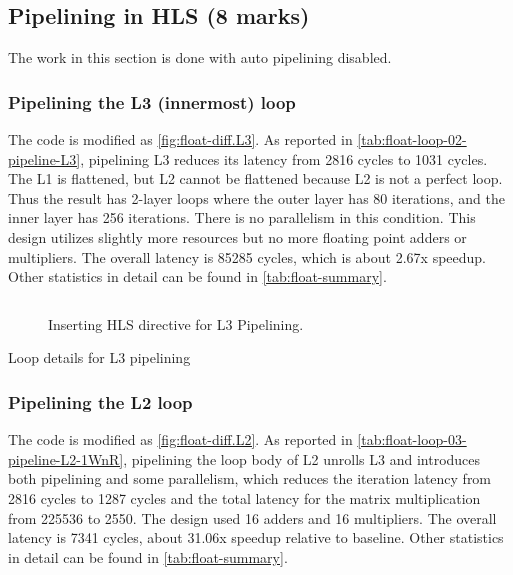 \subsection{Pipelining in HLS (8 marks)}

The work in this section is done with auto pipelining disabled.

\subsubsection{Pipelining the L3 (innermost) loop}\label{sec:1bL3}

The code is modified as \autoref{fig:float-diff.L3}.
As reported in \autoref{tab:float-loop-02-pipeline-L3}, pipelining L3 reduces its latency from 2816 cycles to 1031 cycles.
The L1 is flattened, but L2 cannot be flattened because L2 is not a perfect loop.
Thus the result has 2-layer loops where the outer layer has 80 iterations, and the inner layer has 256 iterations.
There is no parallelism in this condition.
This design utilizes slightly more resources but no more floating point adders or multipliers.
The overall latency is 85285 cycles, which is about 2.67x speedup.
Other statistics in detail can be found in \autoref{tab:float-summary}.

\begin{figure}[ht!]
    \centering
    \inputminted{diff}{program/diff.L3}
    \caption{Inserting HLS directive for L3 Pipelining.}\label{fig:float-diff.L3}
\end{figure}

\begin{table}[ht!]
    \caption{Loop details for L3 pipelining}
    \label{tab:float-loop-02-pipeline-L3}
    \centering
    
\end{table}

\subsubsection{Pipelining the L2 loop}\label{sec:1bL2}

The code is modified as \autoref{fig:float-diff.L2}.
As reported in \autoref{tab:float-loop-03-pipeline-L2-1WnR}, pipelining the loop body of L2 unrolls L3 and introduces both pipelining and some parallelism, which reduces the iteration latency from 2816 cycles to 1287 cycles and the total latency for the matrix multiplication from 225536 to 2550.
The design used 16 adders and 16 multipliers.
The overall latency is 7341 cycles, about 31.06x speedup relative to baseline.
Other statistics in detail can be found in \autoref{tab:float-summary}.

